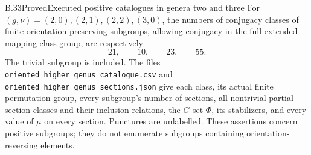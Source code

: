 \begin{claim}{B.33}{Proved}{Executed positive catalogues in genera two and three}
For $(g,\nu)=(2,0),(2,1),(2,2),(3,0)$, the numbers of conjugacy
classes of finite orientation-preserving subgroups, allowing conjugacy
in the full extended mapping class group, are respectively
\[
                         21,\qquad10,\qquad23,\qquad55.
\]
The trivial subgroup is included. The files
\texttt{oriented\_higher\_genus\_catalogue.csv} and
\texttt{oriented\_higher\_genus\_sections.json} give each class,
its actual finite permutation group, every subgroup's number of
sections, all nontrivial partial-section classes and their inclusion
relations, the $G$-set $\Phi$, its stabilizers, and every value of
$\mu$ on every section. Punctures are unlabelled. These assertions
concern positive subgroups; they do not enumerate subgroups containing
orientation-reversing elements.
\end{claim}
